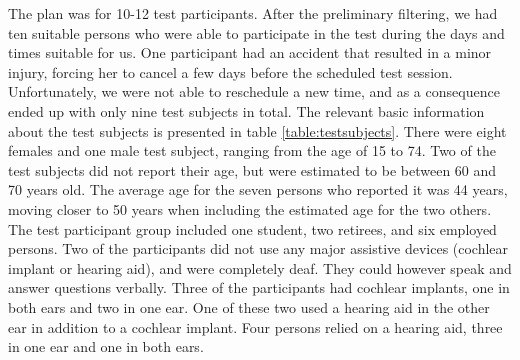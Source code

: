 \documentclass[english, 12pt, a4paper, pdftex, elec, utf8]{aaltothesis}
\begin{document}
The plan was for 10-12 test participants. After the preliminary filtering, we had ten suitable persons who were able to participate in the test during the days and times suitable for us. One participant had an accident that resulted in a minor injury, forcing her to cancel a few days before the scheduled test session. Unfortunately, we were not able to reschedule a new time, and as a consequence ended up with only nine test subjects in total. The relevant basic information about the test subjects is presented in table \ref{table:testsubjects}. There were eight females and one male test subject, ranging from the age of 15 to 74. Two of the test subjects did not report their age, but were estimated to be between 60 and 70 years old. The average age for the seven persons who reported it was 44 years, moving closer to 50 years when including the estimated age for the two others. The test participant group included one student, two retirees, and six employed persons. Two of the participants did not use any major assistive devices (cochlear implant or hearing aid), and were completely deaf. They could however speak and answer questions verbally. Three of the participants had cochlear implants, one in both ears and two in one ear. One of these two used a hearing aid in the other ear in addition to a cochlear implant. Four persons relied on a hearing aid, three in one ear and one in both ears.
\end{document}
